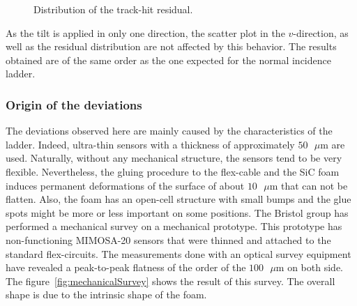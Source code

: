       \begin{figure}
        \caption{Distribution of the track-hit residual.}
        \label{fig:residualDef}
      \end{figure}

      As the tilt is applied in only one direction, the scatter plot in the $v$-direction, as well as the residual distribution are not affected by this behavior. 
      The results obtained are of the same order as the one expected for the normal incidence ladder.
    
      \subsubsection{Origin of the deviations}

      The deviations observed here are mainly caused by the characteristics of the ladder.
      Indeed, ultra-thin sensors with a thickness of approximately $50 \text{ }\mu\text{m}$ are used.
      Naturally, without any mechanical structure, the sensors tend to be very flexible.
      Nevertheless, the gluing procedure to the flex-cable and the \gls{SiC} foam induces permanent deformations of the surface of about $10 \text{ }\mu\text{m}$ that can not be flatten.
      Also, the foam has an open-cell structure with small bumps and the glue spots might be more or less important on some positions.
      The Bristol group has performed a mechanical survey on a mechanical prototype.
      This prototype has non-functioning MIMOSA-20 sensors that were thinned and attached to the standard flex-circuits.
      The measurements done with an optical survey equipment have revealed a peak-to-peak flatness of the order of the $100 \text{ }\mu\text{m}$ on both side.
      The figure~\ref{fig:mechanicalSurvey} shows the result of this survey.
      The overall shape is due to the intrinsic shape of the foam.
       
